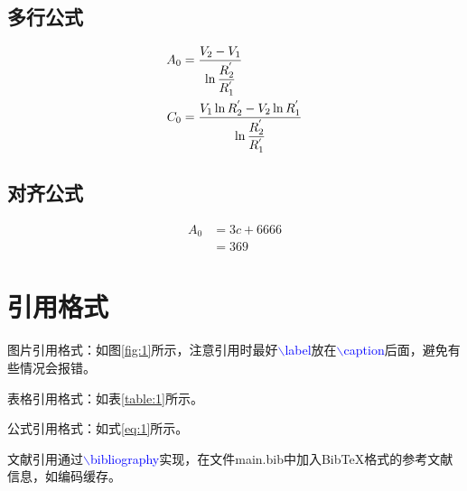 \documentclass[12pt,a4paper]{article}%
\begin{document}
    \subsection{多行公式}
    \begin{equation}
    	\centering
    	\begin{split}%
    		A_0&=\frac{V_2-V_1}{\ln \dfrac{R_{2}^{'}}{R_{1}^{'}}}\\
    		C_0&=\frac{V_1\ln R_{2}^{'}-V_2\ln R_{1}^{'}}{\ln \dfrac{R_{2}^{'}}{R_{1}^{'}}}
    	\end{split}
    \end{equation}

    \subsection{对齐公式}
    \begin{align}%
    		A_0&=3c+6666\\%
    		&=369
    \end{align}

    \section{引用格式}
    图片引用格式：如图\ref{fig:1}所示，注意引用时最好\textcolor{blue}{$\backslash$label}放在\textcolor{blue}{$\backslash$caption}后面，避免有些情况会报错。

    表格引用格式：如表\ref{table:1}所示。

    公式引用格式：如式\eqref{eq:1}所示。

    文献引用通过\textcolor{blue}{$\backslash$bibliography}实现，在文件main.bib中加入BibTeX格式的参考文献信息，如编码缓存\cite{maddah2014fundamental}。
    


    
    
\end{document}
